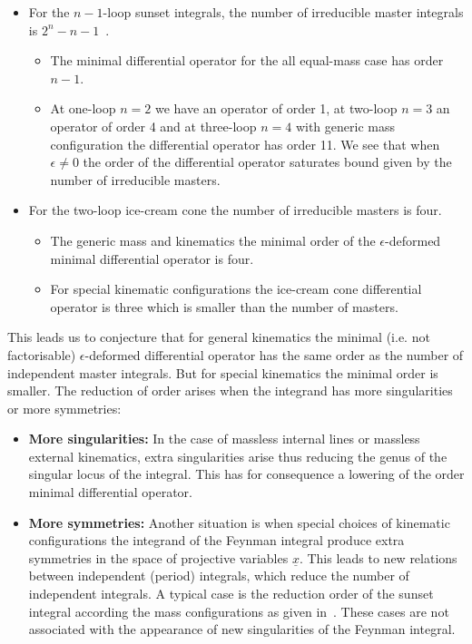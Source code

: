 \documentclass[a4paper,12pt]{article}
\numberwithin{equation}{section}
\numberwithin{figure}{section}
\begin{document}
\begin{itemize}
	\item  For the $n-1$-loop
	sunset integrals, the number of irreducible master integrals 
	is $2^{n}-n-1$~\cite{Kalmykov:2012rr,Bitoun:2017nre}. 
%
%	
	\begin{itemize}  \item The minimal differential operator for the all
		equal-mass case has order  $n-1$.
		\item At one-loop $n=2$ we have an operator of order 1, at two-loop
		$n=3$ an operator of order 4 and at three-loop $n=4$ with generic
		mass configuration the differential operator
		has   order 11.  We see that when $\epsilon\neq0$  the order of the
		differential operator saturates bound given by the number of
		irreducible masters.
	\end{itemize}
	\item For the two-loop ice-cream cone the number of irreducible
          masters is four.
          \begin{itemize}
            \item The generic mass and kinematics the minimal order of the $\epsilon$-deformed minimal differential
	operator is four.
        \item For special kinematic configurations  the ice-cream cone
          differential operator  is three which is smaller than the
          number of masters.
        \end{itemize}
        \end{itemize}
This leads us to conjecture that 
 for general kinematics the minimal (i.e. not
factorisable) $\epsilon$-deformed differential operator has 
the same order
as the number of independent master integrals. But for special kinematics the minimal
order is smaller.
%
The reduction of order arises when the integrand has more
singularities or more symmetries:
\begin{itemize}
  \item {\bf More singularities:} In the case of
massless internal lines or massless external kinematics, extra
singularities arise thus reducing the genus of the
singular locus of the integral.  This has for  consequence a lowering
of the order  minimal differential operator.

\item {\bf More symmetries:}
Another situation is when special choices of kinematic
configurations the integrand of the Feynman integral produce extra
symmetries in the space of projective variables $\underline
x$. This leads to new relations between independent (period) integrals, which reduce the number of independent integrals. A typical case is the
reduction order of the sunset integral according the mass
configurations as given
in~\cite{Bloch:2014qca,Lairez:2022zkj,Bonisch:2021yfw,Bonisch:2020qmm,Pogel:2022vat}. These
cases are not associated with the appearance of new singularities of
the Feynman integral.
\end{itemize}
\end{document}
